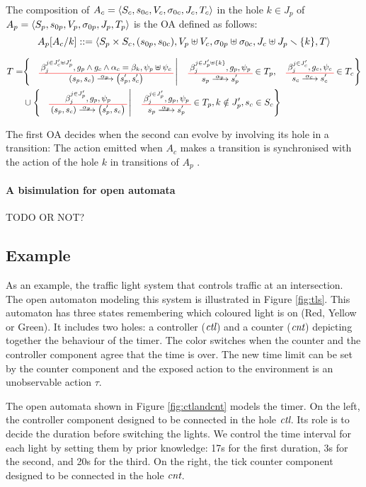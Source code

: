 \documentclass[runningheads]{llncs}
\newcommand{\symb}[1]{\makebox{\it #1}}
\begin{document}
\begin{definition}
The composition of \(A_c = \OAg[c]\) in the hole \(k \in J_p\) of \(A_p = \OAg[p]\) is the OA defined as follows:
\[A_p\subst{A_c}{k} ::=  \OA{S_p \times S_c}{\mpar{s_{0p}, s_{0c}}}{V_p \uplus V_c}{\sigma_{0p} \uplus \sigma_{0c}}{J_c \uplus J_p \setminus \mbrc{k}}{T} \] 

\begin{align*}
T=& \mset{\OT{\mpar{s_p, s_c}}{\mpar{s'_p, s'_c}}{\alpha_p}{\beta_j^{j \in J'_c \uplus J'_p}}{g_p \wedge g_c \wedge \alpha_c = \beta_k}{\psi_p \uplus \psi_c}}{ \OT{s_p}{s'_p}{\alpha_p}{\beta_j^{j \in J'_p \uplus \mbrc{k} }}{g_p}{\psi_p} \in T_p, \OTx{c}{}{}{c} \in T_c} \\
	& \cup \mset{\OT{\mpar{s_p, s_c}}{\mpar{s'_p, s_c}}{\alpha_p}{\beta_j^{j \in J'_p}}{g_p}{\psi_p}}{\OTx{p}{}{}{p} \in T_p, k \notin J'_p, s_c \in S_c}
\end{align*}
\end{definition}
The first OA decides when the second can evolve by involving its hole in a transition:
The action emitted when \(A_c\) makes a transition is synchronised with the action of the hole \(k\) in transitions of \(A_p\) .


\paragraph{A bisimulation for open automata}

TODO OR NOT?

\subsection{Example}

As an example, the traffic light system  that controls  
 traffic at an intersection. The open automaton  
modeling this system  is illustrated in  Figure \ref{fig:tls}. This automaton has three states  remembering which coloured light
is on (Red, Yellow or Green). It includes two holes: a controller ($\symb{ctl}$) and a counter ($\symb{cnt}$)  depicting together the behaviour of the timer. The color switches when the counter and the controller component agree that the time is over. The new time limit can be set by the counter component and the exposed action to the environment is an unobservable  action $\tau$.

The open automata shown in Figure  \ref{fig:ctlandcnt} models  the timer. On the left, the controller component designed to be connected in the hole $\symb{ctl}$.  Its role is to decide the duration before switching the lights. 
We control the time interval for each light by setting them by prior knowledge:  17s for the first duration, 3s for the second, and 20s for the third. On the right, the tick counter component designed to be connected in the hole $\symb{cnt}$.                                                                                                                                     
\end{document}
